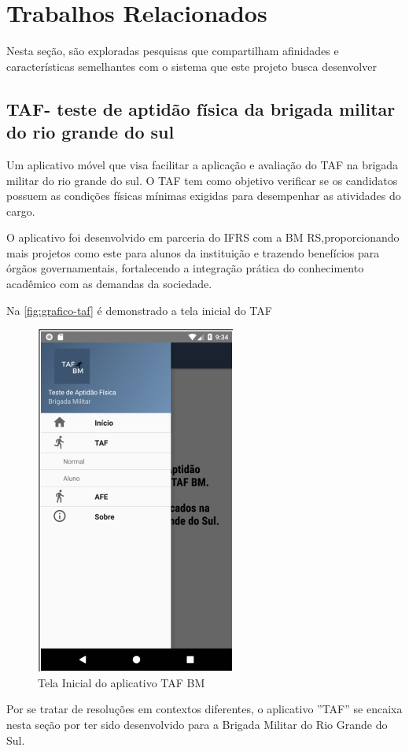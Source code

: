 \chapter{Trabalhos Relacionados}
Nesta seção, são exploradas pesquisas que compartilham afinidades e características semelhantes com o sistema que este projeto busca desenvolver

\section{TAF- teste de aptidão física da brigada militar do rio grande do sul}
Um aplicativo móvel que visa facilitar a aplicação e avaliação do TAF na brigada militar do rio grande do sul. 
O TAF tem como objetivo verificar se os candidatos possuem as condições físicas mínimas exigidas para desempenhar as atividades do cargo.

O aplicativo foi desenvolvido em parceria do IFRS com a BM RS,proporcionando mais projetos como este para alunos da instituição e trazendo benefícios para órgãos governamentais, fortalecendo a integração prática do conhecimento acadêmico com as demandas da sociedade.

Na \autoref{fig:grafico-taf} é demonstrado a tela inicial do TAF

\begin{figure}[htb]
    \caption{\label{fig:grafico-taf}Tela Inicial do aplicativo TAF BM}
    \begin{center}
        \includegraphics[scale=0.9]{imagens/taf.png}
    \end{center}
\end{figure}
Por se tratar de resoluções em contextos diferentes, o aplicativo ''TAF'' se encaixa nesta seção por ter sido desenvolvido para a Brigada Militar do Rio Grande do Sul.   

